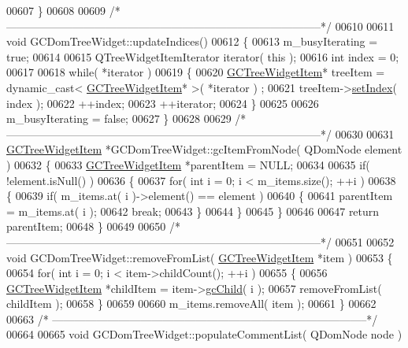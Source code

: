 \begin{DoxyCode}
00607 \}
00608 
00609 \textcolor{comment}{/*
      --------------------------------------------------------------------------------------*/}
00610 
00611 \textcolor{keywordtype}{void} GCDomTreeWidget::updateIndices()
00612 \{
00613   m\_busyIterating = \textcolor{keyword}{true};
00614 
00615   QTreeWidgetItemIterator iterator( \textcolor{keyword}{this} );
00616   \textcolor{keywordtype}{int} index = 0;
00617 
00618   \textcolor{keywordflow}{while}( *iterator )
00619   \{
00620     \hyperlink{class_g_c_tree_widget_item}{GCTreeWidgetItem}* treeItem = \textcolor{keyword}{dynamic\_cast<} \hyperlink{class_g_c_tree_widget_item}{GCTreeWidgetItem}* \textcolor{keyword}{>}( *iterator )
      ;
00621     treeItem->\hyperlink{class_g_c_tree_widget_item_af1f6be4d3badc00db1f92de2e7deb71f}{setIndex}( index );
00622     ++index;
00623     ++iterator;
00624   \}
00625 
00626   m\_busyIterating = \textcolor{keyword}{false};
00627 \}
00628 
00629 \textcolor{comment}{/*
      --------------------------------------------------------------------------------------*/}
00630 
00631 \hyperlink{class_g_c_tree_widget_item}{GCTreeWidgetItem} *GCDomTreeWidget::gcItemFromNode( QDomNode element )
00632 \{
00633   \hyperlink{class_g_c_tree_widget_item}{GCTreeWidgetItem} *parentItem = NULL;
00634 
00635   \textcolor{keywordflow}{if}( !element.isNull() )
00636   \{
00637     \textcolor{keywordflow}{for}( \textcolor{keywordtype}{int} i = 0; i < m\_items.size(); ++i )
00638     \{
00639       \textcolor{keywordflow}{if}( m\_items.at( i )->element() == element )
00640       \{
00641         parentItem = m\_items.at( i );
00642         \textcolor{keywordflow}{break};
00643       \}
00644     \}
00645   \}
00646 
00647   \textcolor{keywordflow}{return} parentItem;
00648 \}
00649 
00650 \textcolor{comment}{/*
      --------------------------------------------------------------------------------------*/}
00651 
00652 \textcolor{keywordtype}{void} GCDomTreeWidget::removeFromList( \hyperlink{class_g_c_tree_widget_item}{GCTreeWidgetItem} *item )
00653 \{
00654   \textcolor{keywordflow}{for}( \textcolor{keywordtype}{int} i = 0; i < item->childCount(); ++i )
00655   \{
00656     \hyperlink{class_g_c_tree_widget_item}{GCTreeWidgetItem} *childItem = item->\hyperlink{class_g_c_tree_widget_item_af44c0d2c5eaa1c5bb3a6a1aace3e8c78}{gcChild}( i );
00657     removeFromList( childItem );
00658   \}
00659 
00660   m\_items.removeAll( item );
00661 \}
00662 
00663 \textcolor{comment}{/*
      --------------------------------------------------------------------------------------*/}
00664 
00665 \textcolor{keywordtype}{void} GCDomTreeWidget::populateCommentList( QDomNode node )

\end{DoxyCode}

